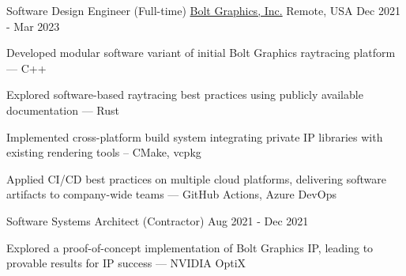 

\begin{cventries}
  \cventry
    {Software Design Engineer (Full-time)} %
    {\href{https://www.bolt.graphics/}{Bolt Graphics, Inc.}} %
    {Remote, USA} %
    {Dec 2021 - Mar 2023} %
    {
      \begin{cvitems} %
        \item Developed modular software variant of initial Bolt Graphics raytracing platform --- C++
        \item Explored software-based raytracing best practices using publicly available documentation --- Rust
        \item Implemented cross-platform build system integrating private IP libraries with existing rendering tools -- CMake, vcpkg
        \item Applied CI/CD best practices on multiple cloud platforms, delivering software artifacts to company-wide teams --- GitHub Actions, Azure DevOps
      \end{cvitems}
    }

  \cventry
    {Software Systems Architect (Contractor)} %
    {} %
    {} %
    {Aug 2021 - Dec 2021} %
    {
      \begin{cvitems} %
        \item Explored a proof-of-concept implementation of Bolt Graphics IP, leading to provable results for IP success --- NVIDIA OptiX
      \end{cvitems}
    }


\end{cventries}
